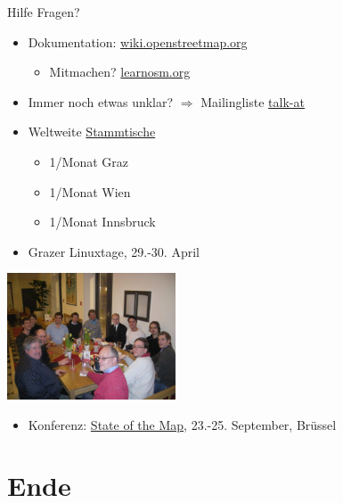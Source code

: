\documentclass{beamer}
\begin{document}
\begin{frame}{Hilfe}
Fragen? 
\begin{itemize}
  \item Dokumentation: \href{http://wiki.openstreetmap.org}{wiki.openstreetmap.org}
  \begin{itemize} 
    \item Mitmachen? \href{http://learnosm.org/}{learnosm.org}
  \end{itemize}
  \item Immer noch etwas unklar? $\Rightarrow$ Mailingliste \href{http://lists.openstreetmap.org/listinfo/talk-at}{talk-at}
 \vspace*{0.4cm}
  \item Weltweite \href{http://usergroups.openstreetmap.de/}{Stammtische}
  \begin{itemize}
    \item 1/Monat Graz
    \item 1/Monat Wien
    \item 1/Monat Innsbruck
  \end{itemize}
 \vspace*{0.4cm}
  \item Grazer Linuxtage, 29.-30. April

\end{itemize}

 \vspace*{-2.8cm}
\hfill\includegraphics[width=5cm]{Salzburg_stammtisch.jpg}

\begin{itemize}
  \item Konferenz: \href{http://stateofthemap.org/}{State of the Map}, 23.-25. September, Brüssel
\end{itemize}
\end{frame}

\section{Ende}
\end{document}
